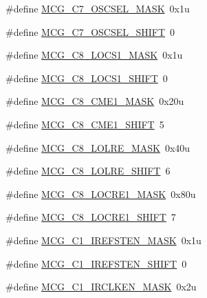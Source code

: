 \begin{DoxyCompactItemize}
\item 
\#define \hyperlink{group___m_c_g___register___masks_ga8f29d6e2e3ddd8725de2ea86d8f0548f}{M\+C\+G\+\_\+\+C7\+\_\+\+O\+S\+C\+S\+E\+L\+\_\+\+M\+A\+SK}~0x1u
\item 
\#define \hyperlink{group___m_c_g___register___masks_ga36e349718cb5e8af96efea408f059dcb}{M\+C\+G\+\_\+\+C7\+\_\+\+O\+S\+C\+S\+E\+L\+\_\+\+S\+H\+I\+FT}~0
\item 
\#define \hyperlink{group___m_c_g___register___masks_ga1417ca27a647ced3cdfc504a604f8dc8}{M\+C\+G\+\_\+\+C8\+\_\+\+L\+O\+C\+S1\+\_\+\+M\+A\+SK}~0x1u
\item 
\#define \hyperlink{group___m_c_g___register___masks_ga648e426b4d1f976cca5229505a26d9a8}{M\+C\+G\+\_\+\+C8\+\_\+\+L\+O\+C\+S1\+\_\+\+S\+H\+I\+FT}~0
\item 
\#define \hyperlink{group___m_c_g___register___masks_ga9e0e0db74d7e18fffad7b4f08eb74524}{M\+C\+G\+\_\+\+C8\+\_\+\+C\+M\+E1\+\_\+\+M\+A\+SK}~0x20u
\item 
\#define \hyperlink{group___m_c_g___register___masks_ga00dc55bd1e2197897d59597dd57592ba}{M\+C\+G\+\_\+\+C8\+\_\+\+C\+M\+E1\+\_\+\+S\+H\+I\+FT}~5
\item 
\#define \hyperlink{group___m_c_g___register___masks_gaeab391a933aec2eeb1ffdbc772f714e2}{M\+C\+G\+\_\+\+C8\+\_\+\+L\+O\+L\+R\+E\+\_\+\+M\+A\+SK}~0x40u
\item 
\#define \hyperlink{group___m_c_g___register___masks_ga247e347342c951c4b8044bece01311fb}{M\+C\+G\+\_\+\+C8\+\_\+\+L\+O\+L\+R\+E\+\_\+\+S\+H\+I\+FT}~6
\item 
\#define \hyperlink{group___m_c_g___register___masks_gad7fe66acc8b6391ccfe2c53b61a9b119}{M\+C\+G\+\_\+\+C8\+\_\+\+L\+O\+C\+R\+E1\+\_\+\+M\+A\+SK}~0x80u
\item 
\#define \hyperlink{group___m_c_g___register___masks_gad97e280f47539832dda56a845055c921}{M\+C\+G\+\_\+\+C8\+\_\+\+L\+O\+C\+R\+E1\+\_\+\+S\+H\+I\+FT}~7
\item 
\#define \hyperlink{group___m_c_g___register___masks_ga275f9145f8c55ff4c836cbd20ab06139}{M\+C\+G\+\_\+\+C1\+\_\+\+I\+R\+E\+F\+S\+T\+E\+N\+\_\+\+M\+A\+SK}~0x1u
\item 
\#define \hyperlink{group___m_c_g___register___masks_ga10e0a80bfe715350aba6d5f5212617bc}{M\+C\+G\+\_\+\+C1\+\_\+\+I\+R\+E\+F\+S\+T\+E\+N\+\_\+\+S\+H\+I\+FT}~0
\item 
\#define \hyperlink{group___m_c_g___register___masks_ga50398d9dc80a3016fddc6a2aef3df994}{M\+C\+G\+\_\+\+C1\+\_\+\+I\+R\+C\+L\+K\+E\+N\+\_\+\+M\+A\+SK}~0x2u
\item 

\end{DoxyCompactItemize}
